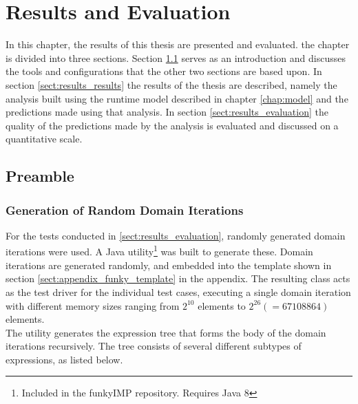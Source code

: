 \chapter{Results and Evaluation}
\label{chap:results}
In this chapter, the results of this thesis are presented and evaluated. the chapter is divided into three sections. Section \ref{sect:results_preamble} serves as an introduction and discusses the tools and configurations that the other two sections are based upon. In section \ref{sect:results_results} the results of the thesis are described, namely the analysis built using the runtime model described in chapter \ref{chap:model} and the predictions made using that analysis. In section \ref{sect:results_evaluation} the quality of the predictions made by the analysis is evaluated and discussed on a quantitative scale.

\section{Preamble}
\label{sect:results_preamble}
\subsection{Generation of Random Domain Iterations}
\label{sect:results_preamble_random}

For the tests conducted in \ref{sect:results_evaluation}, randomly generated domain iterations were used. A Java utility\footnote{Included in the funkyIMP repository. Requires Java 8} was built to generate these. Domain iterations are generated randomly, and embedded into the template shown in section \ref{sect:appendix_funky_template} in the appendix. The resulting class acts as the test driver for the individual test cases, executing a single domain iteration with different memory sizes ranging from $2^{10}$ elements to $2^{26} (=67108864)$ elements. \\

The utility generates the expression tree that forms the body of the domain iterations recursively. The tree consists of several different subtypes of expressions, as listed below.

